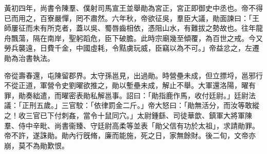 \begin{pinyinscope}
黃初四年，尚書令陳羣、僕射司馬宣王並舉勛為宮正，宮正即御史中丞也。帝不得已而用之，百寮嚴憚，罔不肅然。六年秋，帝欲征吳，羣臣大議，勛面諫曰：「王師屢征而未有所克者，蓋以吳、蜀唇齒相依，憑阻山水，有難拔之勢故也。往年龍舟飄蕩，隔在南岸，聖躬蹈危，臣下破膽。此時宗廟幾至傾覆，為百世之戒。今又勞兵襲遠，日費千金，中國虛耗，令黠虜玩威，臣竊以為不可。」帝益忿之，左遷勛為治書執法。

帝從壽春還，屯陳留郡界。太守孫邕見，出過勛。時營壘未成，但立摽埒，邕邪行不從正道，軍營令史劉曜欲推之，勛以塹壘未成，解止不舉。大軍還洛陽，曜有罪，勛奏絀遣，而曜密表勛私解邕事。詔曰：「勛指鹿作馬，收付廷尉。」廷尉法議：「正刑五歲。」三官駮：「依律罰金二斤。」帝大怒曰：「勛無活分，而汝等敢縱之！收三官已下付刺姦，當令十鼠同穴。」太尉鍾繇、司徒華歆、鎮軍大將軍陳羣、侍中辛毗、尚書衞臻、守廷尉高柔等並表「勛父信有功於太祖」，求請勛罪。帝不許，遂誅勛。勛內行旣脩，廉而能施，死之日，家無餘財。後二旬，文帝亦崩，莫不為勛歎恨。


\end{pinyinscope}